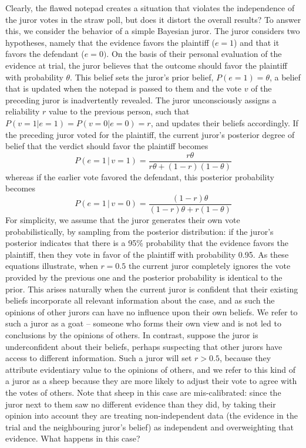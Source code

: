 \documentclass[doc]{apa6}
\newcommand{\given}{\, | \,}
\begin{document}
Clearly, the flawed notepad creates a situation that violates the independence of the juror votes in the straw poll, but does it distort the overall results? To answer this, we consider the behavior of a simple Bayesian juror. The juror considers two hypotheses, namely that the evidence favors the plaintiff ($e=1$) and that it favors the defendant ($e=0)$. On the basis of their personal evaluation of the evidence at trial, the juror believes that the outcome should favor the plaintiff with probability $\theta$. This belief sets the juror's prior belief, $P(e=1)=\theta$, a belief that is updated when the notepad is passed to them and the vote $v$ of the preceding juror is inadvertently revealed. The juror unconsciously assigns a reliability $r$ value to the previous person, such that $P(v=1|e=1) = P(v=0|e=0) = r$, and updates their beliefs accordingly. If the preceding juror voted for the plaintiff, the current juror's posterior degree of belief that the verdict should favor the plaintiff becomes
\begin{equation}
P(e=1 \given v=1) = \frac{r\theta}{r\theta+ (1-r)(1-\theta)}
\label{sheepgoat1}
\end{equation}
whereas if the earlier vote favored the defendant, this posterior probability becomes
\begin{equation}
P(e=1 \given v=0) = \frac{(1-r)\theta}{(1-r)\theta + r(1-\theta)}
\label{sheepgoat2}
\end{equation}
For simplicity, we assume that the juror generates their own vote probabilistically, by sampling from the posterior distribution: if the juror's posterior indicates that there is a 95\% probability that the evidence favors the plaintiff, then they vote in favor of the plaintiff with probability 0.95. As these equations illustrate, when $r=0.5$ the current juror completely ignores the vote provided by the previous one and the posterior probability is identical to the prior. This arises naturally when the current juror is confident that their existing beliefs incorporate all relevant information about the case, and as such the opinions of other jurors can have no influence upon their own beliefs. We refer to such a juror as a {\sc goat} -- someone who forms their own view and is not led to conclusions by the opinions of others. In contrast, suppose the juror is underconfident about their beliefs, perhaps suspecting that other jurors have access to different information. Such a juror will set $r>0.5$, because they attribute evidentiary value to the opinions of others, and we refer to this kind of a juror as a {\sc sheep} because they are more likely to adjust their vote to agree with the votes of others. Note that {\sc sheep} in this case are mis-calibrated: since the juror next to them saw no different evidence than they did, by taking their opinion into account they are treating non-independent data (the evidence in the trial and the neighbouring juror’s belief) as independent and overweighting that evidence. What happens in this case? 
\end{document}
